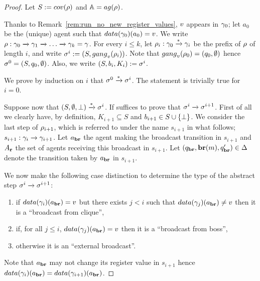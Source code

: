 \ifproofs
\begin{proof}
Let $\covset := \statesin{\run}$ and $\agents = \agentsof{\run}$.

Thanks to Remark~\ref{rem:run_no_new_register_values},  $v$ appears in $\gamma_0$; let $a_0$ be the (unique) agent such that $\data{\config_0}(a_0) = \aval$. We write $\rho : \gamma_0 \xrightarrow{} \gamma_1 \xrightarrow{} \dots \xrightarrow{} \gamma_k = \gamma$. For every $i \leq k$, let $\rho_i : \gamma_0 \xrightarrow{*} \gamma_i$ be the prefix of $\rho$ of length $i$, and write $\aconfig^i := (\covset, \gangof{\aval}{\run_i})$. Note that $\gangof{\aval}{\run_0} = (q_0, \emptyset)$ hence $\sigma^0 = (S, q_0, \emptyset)$. Also, we write $(\covset, \boss_i, \clique_i) := \aconfig^i$.

We prove by induction on $i$ that $\sigma^0 \xrightarrow{*} \sigma^i$.
The statement is trivially true for $i =0$. 

Suppose now that $(S, \emptyset, \bot) \xrightarrow{*} \sigma^i$. 
If suffices to prove that $\sigma^i \xrightarrow{} \sigma^{i+1}$. First of all we clearly have, by definition, $K_{i+1} \subseteq S$ and $\boss_{i+1}\in S\cup\set{\noboss}$. We consider the last step of $\rho_{i+1}$, which is referred to under the name $s_{i+1}$ in what follows; $s_{i+1}: \gamma_i \xrightarrow{} \gamma_{i+1}$. Let $a_{\textbf{br}}$ the agent making the broadcast transition in $s_{i+1}$ and $A_{\textbf{r}}$ the set of agents receiving this broadcast in $s_{i+1}$. Let $(q_{\textbf{br}}, \textbf{br}(m), q_{\textbf{br}}') \in \Delta$ denote the transition taken by $a_{\textbf{br}}$ in $s_{i+1}$.

We now make the following case distinction to determine the type of the abstract step $\sigma^i \xrightarrow{} \sigma^{i+1}$:
\begin{enumerate}
\item\label{proof_completeness:case_broadcast_clique} if $\data{\config_{i}}(\agentbr) = \aval$ but there exists $j<i$ such that $\data{\config_{j}}(\agentbr) \ne \aval$ then it is a ``broadcast from clique'',
\item\label{proof_completeness:case_broadcast_boss} if, for all $j \leq i$, $\data{\config_j}(\agentbr) = \aval$ then it is a ``broadcast from boss'',
\item\label{proof_completeness:case_external_broadcast} otherwise it is an ``external broadcast''. 
\end{enumerate}
Note that $a_{\textbf{br}}$ may not change its register value in $s_{i+1}$ hence $\data{\config_i}(\agentbr) = \data{\config_{i+1}}(\agentbr)$. 


\end{proof}
